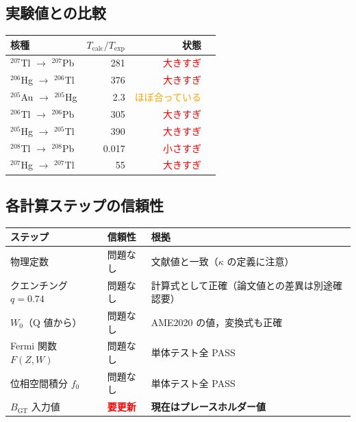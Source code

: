 \documentclass[12pt,a4paper]{ltjsarticle}
\begin{document}
\subsection{実験値との比較}

\begin{center}
\renewcommand{\arraystretch}{1.3}
\begin{tabular}{lrrr}
\toprule
核種 & $T_\text{calc}/T_\text{exp}$ & 状態 \\
\midrule
$^{207}$Tl $\to$ $^{207}$Pb & 281 & \textcolor{red}{大きすぎ} \\
$^{206}$Hg $\to$ $^{206}$Tl & 376 & \textcolor{red}{大きすぎ} \\
$^{205}$Au $\to$ $^{205}$Hg & 2.3 & \textcolor{orange}{ほぼ合っている} \\
$^{206}$Tl $\to$ $^{206}$Pb & 305 & \textcolor{red}{大きすぎ} \\
$^{205}$Hg $\to$ $^{205}$Tl & 390 & \textcolor{red}{大きすぎ} \\
$^{208}$Tl $\to$ $^{208}$Pb & 0.017 & \textcolor{red}{小さすぎ} \\
$^{207}$Hg $\to$ $^{207}$Tl & 55 & \textcolor{red}{大きすぎ} \\
\bottomrule
\end{tabular}
\end{center}

\subsection{各計算ステップの信頼性}

\begin{center}
\begin{tabular}{lll}
\toprule
ステップ & 信頼性 & 根拠 \\
\midrule
物理定数 & \textcolor{green!60!black}{問題なし} & 文献値と一致（$\kappa$ の定義に注意）\\
クエンチング $q=0.74$ & \textcolor{green!60!black}{問題なし} & 計算式として正確（論文値との差異は別途確認要）\\
$W_0$（Q 値から）& \textcolor{green!60!black}{問題なし} & AME2020 の値，変換式も正確 \\
Fermi 関数 $F(Z,W)$ & \textcolor{green!60!black}{問題なし} & 単体テスト全 PASS \\
位相空間積分 $f_0$ & \textcolor{green!60!black}{問題なし} & 単体テスト全 PASS \\
$B_\text{GT}$ 入力値 & \textcolor{red}{\textbf{要更新}} & \textbf{現在はプレースホルダー値} \\
\bottomrule
\end{tabular}
\end{center}
\end{document}
